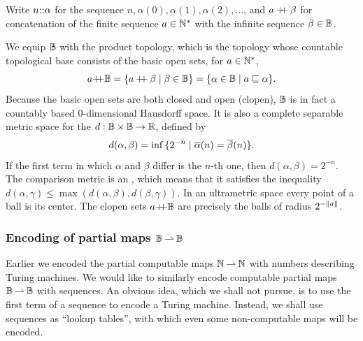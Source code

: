 Write $n {:}{:} \alpha$ for the sequence $n, \alpha(0), \alpha(1), \alpha(2), \ldots$, and $a \mathbin{{+}\!\!{+}} \beta$ for concatenation of the finite sequence $a \in \mathbb{N}^{*}$ with the infinite sequence $\beta \in \mathbb{B}$.

We equip $\mathbb{B}$ with the product topology, which is the topology whose countable topological base consists of the basic open sets, for $a \in \mathbb{N}^{*}$,
%
\begin{equation*}
  a{{+}\!\!{+}}\mathbb{B}
  = \{a \mathbin{{+}\!\!{+}} \beta \mid \beta \in \mathbb{B}\}
  = \{\alpha \in \mathbb{B} \mid a \sqsubseteq \alpha\}.
\end{equation*}
%
Because the basic open sets are both closed and open (clopen),
$\mathbb{B}$ is in fact a countably based $0$-dimensional Hausdorff space. It is also a complete
separable metric space for the  $d : \mathbb{B}
\times \mathbb{B} \to \mathbb{R}$, defined by
%
\begin{equation*}
  d(\alpha, \beta) = \inf \,\{2^{-n} \mid
    \overline{\alpha}(n) = \overline{\beta}(n)\}.
\end{equation*}
%
If the first term in which $\alpha$ and $\beta$ differ is the $n$-th
one, then $d(\alpha, \beta) = 2^{-n}$. The comparison metric is an
, which means that it satisfies the inequality $d(\alpha,
\gamma) \leq \max(d(\alpha, \beta), d(\beta, \gamma))$. In an ultrametric space every point of a ball is its center. The clopen sets $a{{+}\!\!{+}}\mathbb{B}$ are precisely the balls of radius $2^{-\|a\|}$.

\subsubsection{Encoding of partial maps $\mathbb{B} \mathbin{\rightharpoonup} \mathbb{B}$}
\label{sec:encoding-maps-baire}

Earlier we encoded the partial computable maps $\mathbb{N} \mathbin{\rightharpoonup} \mathbb{N}$ with numbers describing Turing machines. We would like to similarly encode computable partial maps $\mathbb{B} \mathbin{\rightharpoonup} \mathbb{B}$ with sequences. An obvious idea, which we shall not pursue, is to use the first term of a sequence to encode a Turing machine. Instead, we shall use sequences as ``lookup tables'', with which even some non-computable maps will be encoded.

